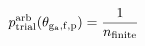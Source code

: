 \documentclass[12pt]{article}
\begin{document}
\begin{displaymath}
p_{\rm trial}^{\rm arb}(\theta_{\rm g_a,f,p}) = {{1}\over{n_{\rm finite}}}
\end{displaymath}
\end{document}
